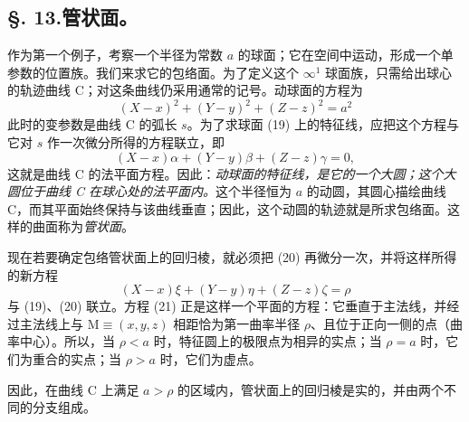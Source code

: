 \subsection*{\S. 13.\quad 管状面。}
作为第一个例子，考察一个半径为常数 \(a\) 的球面；它在空间中运动，形成一个单参数的位置族。我们来求它的包络面。为了定义这个 \(\infty^1\) 球面族，只需给出球心的轨迹曲线 C；对这条曲线仍采用通常的记号。动球面的方程为
\begin{equation}\tag{19}
(X-x)^2+(Y-y)^2+(Z-z)^2=a^2
\end{equation}
此时的变参数是曲线 C 的弧长 \(s\)。为了求球面 (19) 上的特征线，应把这个方程与它对 \(s\) 作一次微分所得的方程联立，即
\begin{equation}\tag{20}
(X-x)\alpha+(Y-y)\beta+(Z-z)\gamma=0,
\end{equation}
这就是曲线 C 的法平面方程。因此：\emph{动球面的特征线，是它的一个大圆；这个大圆位于曲线 C 在球心处的法平面内。}这个半径恒为 \(a\) 的动圆，其圆心描绘曲线 C，而其平面始终保持与该曲线垂直；因此，这个动圆的轨迹就是所求包络面。这样的曲面称为\emph{管状面}。

现在若要确定包络管状面上的回归棱，就必须把 (20) 再微分一次，并将这样所得的新方程
\begin{equation}\tag{21}
(X-x)\xi+(Y-y)\eta+(Z-z)\zeta=\rho
\end{equation}
与 (19)、(20) 联立。方程 (21) 正是这样一个平面的方程：它垂直于主法线，并经过主法线上与 \(\mathrm{M}\equiv(x,y,z)\) 相距恰为第一曲率半径 \(\rho\)、且位于正向一侧的点（曲率中心）。所以，当 \(\rho<a\) 时，特征圆上的极限点为相异的实点；当 \(\rho=a\) 时，它们为重合的实点；当 \(\rho>a\) 时，它们为虚点。

因此，在曲线 C 上满足 \(a>\rho\) 的区域内，管状面上的回归棱是实的，并由两个不同的分支组成。

